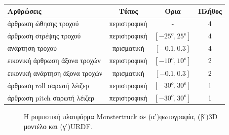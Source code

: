 \begin{table}[!ht]
	\centering
	\label{tab:joints}
	\begin{tabular}{| l | c | c | c |}
		\hline
	   \textbf{Αρθρώσεις} & \textbf{Τύπος} & \textbf{Όρια} & \textbf{Πλήθος}  \\ \hline
	   άρθρωση ώθησης τροχού & περιστροφική & - & 4 \\ \hline
	   άρθρωση στρέψης τροχού & περιστροφική & $[-25^o, 25^o]$ & 4 \\ \hline
	   ανάρτηση τροχού & πρισματική & $[-0.1, 0.3]$ & 4 \\ \hline 
	   εικονική άρθρωση άξονα τροχών & περιστροφική & $[-10^o, 10^o]$ & 2 \\ \hline
	   εικονική ανάρτηση άξονα τροχών & πρισματική & $[-0.1, 0.3]$ & 2 \\ \hline
		άρθρωση roll σαρωτή λέιζερ & περιστροφική & $[-30^o, 30^o]$ & 1 \\ \hline
		άρθρωση pitch σαρωτή λέιζερ & περιστροφική & $[-30^o, 30^o]$ & 1 \\ \hline
	\end{tabular}
\end{table}

\begin{figure}[!ht]
	\caption{Η ρομποτική πλατφόρμα Monstertruck σε (α')φωτογραφία, (β')3D μοντέλο και (γ')URDF.}
	\label{fig:real_model_urdf}
\end{figure}

